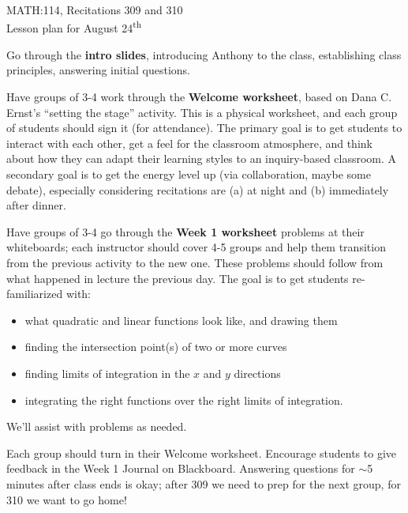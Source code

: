 \documentclass[11pt]{article}
\begin{document}
	\thispagestyle{empty}

	\Large{MATH:114, Recitations 309 and 310} \\
	\large{Lesson plan for August 24\textsuperscript{th}} \\
	
	\begin{description}[leftmargin=8em,style=nextline]
		\item[5-10 minutes] Go through the \textbf{intro slides}, introducing Anthony to the class, establishing class principles, answering initial questions.
		\item[15 minutes] Have groups of 3-4 work through the \textbf{Welcome worksheet}, based on Dana C. Ernst's ``setting the stage'' activity. This is a physical worksheet, and each group of students should sign it (for attendance). The primary goal is to get students to interact with each other, get a feel for the classroom atmosphere, and think about how they can adapt their learning styles to an inquiry-based classroom. A secondary goal is to get the energy level up (via collaboration, maybe some debate), especially considering recitations are (a) at night and (b) immediately after dinner.
		\item[Leftovers] Have groups of 3-4 go through the \textbf{Week 1 worksheet} problems at their whiteboards; each instructor should cover 4-5 groups and help them transition from the previous activity to the new one. These problems should follow from what happened in lecture the previous day. The goal is to get students re-familiarized with:
		
			\begin{itemize}
				\item what quadratic and linear functions look like, and drawing them
				\item finding the intersection point(s) of two or more curves
				\item finding limits of integration in the $x$ and $y$ directions
				\item integrating the right functions over the right limits of integration.
			\end{itemize}
			
			We'll assist with problems as needed.
			
		\item[Closing] Each group should turn in their Welcome worksheet. Encourage students to give feedback in the Week 1 Journal on Blackboard. Answering questions for $\sim$5 minutes after class ends is okay; after 309 we need to prep for the next group, for 310 we want to go home!

	\end{description}

	
	
\end{document}

